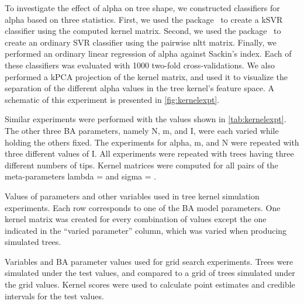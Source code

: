 To investigate the effect of \gls{alpha} on tree shape, we constructed
classifiers for \gls{alpha} based on three statistics. First, we used the
 package~\autocite{zeileis2004kernlab} to create a \gls{kSVR}
classifier using the computed kernel matrix. Second, we used the
 package~\autocite{meyer2015e1071} to create an ordinary
\gls{SVR} classifier using the pairwise \gls{nltt} matrix. Finally, we
performed an ordinary linear regression of \gls{alpha} against Sackin's index.
Each of these classifiers was evaluated with 1000 two-fold cross-validations.
We also performed a \gls{kPCA} projection of the kernel matrix, and used it to
visualize the separation of the different \gls{alpha} values in the tree
kernel's feature space. A schematic of this experiment is presented in
\cref{fig:kernelexpt}.

Similar experiments were performed with the values shown in
\cref{tab:kernelexpt}. The other three \gls{BA} parameters, namely \gls{N},
\gls{m}, and \gls{I}, were each varied while holding the others fixed. The
experiments for \gls{alpha}, \gls{m}, and \gls{N} were repeated with three
different values of \gls{I}. All experiments were repeated with trees having
three different numbers of tips. Kernel matrices were computed for all pairs of
the meta-parameters \gls{lambda} =  and \gls{sigma} =
.

\begin{landscape}
\begin{table}[ht]
  \centering
  
  \caption[Variables used in tree kernel simulation experiments]
  {
    Values of parameters and other variables used in tree kernel simulation
    experiments. Each row corresponds to one of the \gls{BA} model parameters.
    One kernel matrix was created for every combination of values except the
    one indicated in the ``varied parameter'' column, which was varied when
    producing simulated trees.
  }
  \label{tab:kernelexpt}
\end{table}

\begin{table}[ht]
  \centering
  
  \caption[Variables used in grid search experiments]
  {
    Variables and \gls{BA} parameter values used for grid search experiments. 
    Trees were simulated under the test values, and compared to a grid of trees
    simulated under the grid values. Kernel scores were used to calculate point
    estimates and credible intervals for the test values.
  }
  \label{tab:gridexpt}
\end{table}
\end{landscape}

